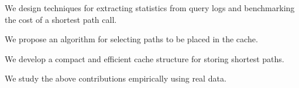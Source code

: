 \documentclass[a3shrink,landscape, final]{baposter}
\begin{document}
\begin{poster}
{     We design techniques for extracting statistics from query logs and benchmarking the cost of a shortest path call. \vspace{0.5em}

     We propose an algorithm for selecting paths to be placed in the cache.\vspace{0.5em}

     We develop a compact and efficient cache structure for storing shortest paths.\vspace{0.5em}

     We study the above contributions empirically using real data.\vspace{0.5em}



% 
% 
}

\end{poster}
\end{document}
